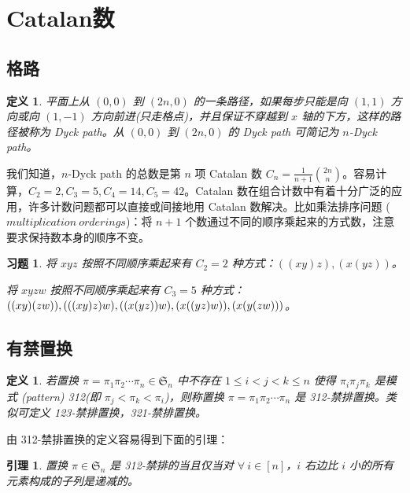 \documentclass[a4paper,11pt,twoside]{book}
\newtheorem{defi}[thm]{定义}
\newtheorem{lem}[thm]{引理}
\newtheorem{ex}[thm]{习题}
\begin{document}
\clearpage




\section{Catalan数}
\subsection{格路}
\begin{defi}
平面上从 $(0, 0)$ 到 $(2n, 0)$ 的一条路径，如果每步只能是向 $(1, 1)$
方向或向 $(1, -1)$ 方向前进(只走格点)，并且保证不穿越到 $x$
轴的下方，这样的路径被称为 Dyck path。从 $(0, 0)$ 到 $(2n, 0)$ 的
Dyck path 可简记为 $n$-Dyck path。
\end{defi}
我们知道，$n$-Dyck path 的总数是第 $n$ 项 Catalan 数
$C_{n}=\frac{1}{n+1}{2n\choose n}$。容易计算，$C_{2}=2, C_{3}=5,
C_{4}=14, C_{5}=42$。Catalan
数在组合计数中有着十分广泛的应用，许多计数问题都可以直接或间接地用
Catalan 数解决。比如乘法排序问题 ($multiplication\ orderings$)：将
$n+1$
个数通过不同的顺序乘起来的方式数，注意要求保持数本身的顺序不变。

\begin{ex}
将 $xyz$ 按照不同顺序乘起来有 $C_{2}=2$ 种方式：$((xy)z), (x(yz))$。

将 $xyzw$ 按照不同顺序乘起来有 $C_{3}=5$ 种方式：$((xy)(zw)),
(((xy)z)w), \\((x(yz))w), (x((yz)w)), (x(y(zw)))$。
\end{ex}
\subsection{有禁置换}

\begin{defi}
若置换 $\pi=\pi_1\pi_2\cdots\pi_n\in\mathfrak{S}_n$ 中不存在 $1\le
i<j<k\le n$ 使得 $\pi_i\pi_j\pi_k$ 是模式 (pattern) 312(即
$\pi_j<\pi_k<\pi_i$)，则称置换 $\pi=\pi_1\pi_2\cdots\pi_n$ 是
312-禁排置换。类似可定义 123-禁排置换，321-禁排置换。
\end{defi}

由 312-禁排置换的定义容易得到下面的引理：

\begin{lem}
置换 $\pi\in\mathfrak{S}_n$ 是 312-禁排的当且仅当对 $\forall\
i\in[n]$，$i$ 右边比 $i$ 小的所有元素构成的子列是递减的。
\end{lem}
\end{document}
